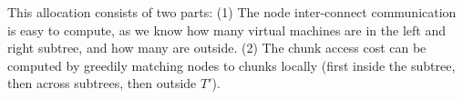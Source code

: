 \documentclass[9pt]{sigcomm-alternate}
\newcommand{\maciek}[1]{\textcolor{brown}{maciek: #1}}
\newcommand{\CostTrans}{\ensuremath{b_1}}
\newcommand{\CostCom}{\ensuremath{b_2}}
\begin{document}
This allocation consists of two parts: (1) The node inter-connect
communication is easy to compute, as we know how many
virtual machines are in the left and right subtree, and how many are
outside.
(2) The chunk access cost
can be computed by greedily matching nodes to chunks locally (first
inside the subtree, then across subtrees, then outside $T'$).



%

%
%
\end{document}
